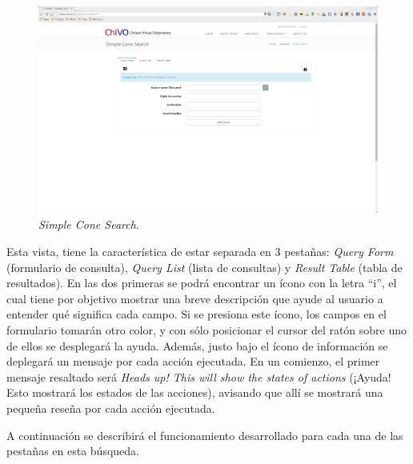 \begin{figure}[ht!]
    \begin{center}
	\includegraphics[scale=.2]{img/scs}
    \end{center}
    \caption{\emph{Simple Cone Search}.}\label{img:scs}
\end{figure}

Esta vista, tiene la característica de estar separada en 3 pestañas:
\emph{Query Form} (formulario de consulta), \emph{Query List} (lista
de consultas) y \emph{Result Table} (tabla de resultados). En las dos
primeras se podrá encontrar un ícono con la letra ``i'', el cual tiene
por objetivo mostrar una breve descripción que ayude al usuario a
entender qué significa cada campo. Si se presiona este ícono, los
campos en el formulario tomarán otro color, y con sólo posicionar el
cursor del ratón sobre uno de ellos se desplegará la ayuda. Además,
justo bajo el ícono de información se deplegará un mensaje por cada
acción ejecutada. En un comienzo, el primer mensaje resaltado será
\emph{Heads up! This will show the states of actions} (¡Ayuda! Esto
mostrará los estados de las acciones), avisando que allí se mostrará
una pequeña reseña por cada acción ejecutada.

A continuación se describirá el funcionamiento desarrollado para cada
una de las pestañas en esta búsqueda.

